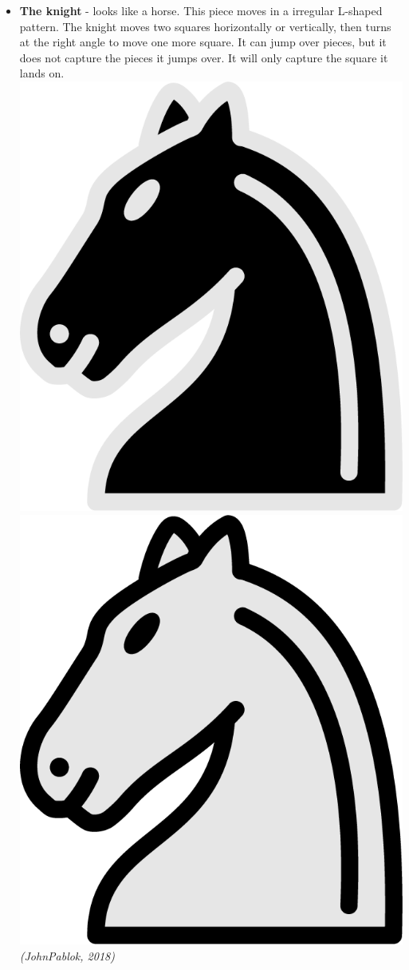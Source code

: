\documentclass{article}
\begin{document}
\begin{itemize}
    \item \textbf{The knight} - looks like a horse. This piece moves in a irregular L-shaped pattern. The knight moves two squares horizontally or vertically, then turns at the right angle to move one more square. It can jump over pieces, but it does not capture the pieces it jumps over. It will only capture the square it lands on. \\
    \includegraphics[scale=0.1]{image13.png}
    \includegraphics[scale=0.1]{image10.png}
    \textit{(JohnPablok, 2018)}
    

\end{itemize}
\end{document}
